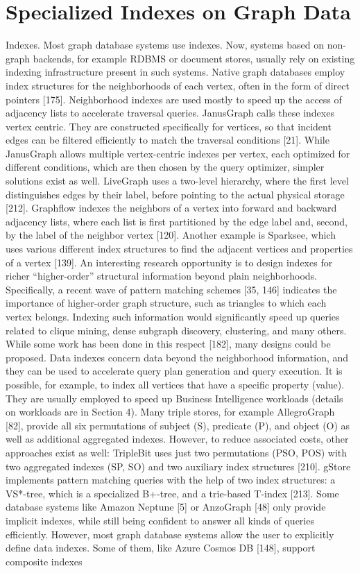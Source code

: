 \chapter{Specialized Indexes on Graph Data}
\label{chap:specialized_indexing}

Indexes. Most graph database systems use indexes. Now, systems based on non-graph backends, for example RDBMS or document stores, usually rely on existing indexing infrastructure present in such systems. Native graph databases employ index structures for the neighborhoods of each vertex, often in the form of direct pointers [175]. Neighborhood indexes are used mostly to speed up the access of adjacency lists to accelerate traversal queries. JanusGraph calls these indexes vertex centric. They are constructed specifically for vertices, so that incident edges can be filtered efficiently to match the traversal conditions [21]. While JanusGraph allows multiple vertex-centric indexes per vertex, each optimized for different conditions, which are then chosen by the query optimizer, simpler solutions exist as well. LiveGraph uses a two-level hierarchy, where the first level distinguishes edges by their label, before pointing to the actual physical storage [212]. Graphflow indexes the neighbors of a vertex into forward and backward adjacency lists, where each list is first partitioned by the edge label and, second, by the label of the neighbor vertex [120]. Another example is Sparksee, which uses various different index structures to find the adjacent vertices and properties of a vertex [139]. An interesting research opportunity is to design indexes for richer “higher-order” structural information beyond plain neighborhoods. Specifically, a recent wave of pattern matching schemes [35, 146] indicates the importance of higher-order graph structure, such as triangles to which each vertex belongs. Indexing such information would significantly speed up queries related to clique mining, dense subgraph discovery, clustering, and many others. While some work has been done in this respect [182], many designs could be proposed. Data indexes concern data beyond the neighborhood information, and they can be used to accelerate query plan generation and query execution. It is possible, for example, to index all vertices that have a specific property (value). They are usually employed to speed up Business Intelligence workloads (details on workloads are in Section 4). Many triple stores, for example AllegroGraph [82], provide all six permutations of subject (S), predicate (P), and object (O) as well as additional aggregated indexes. However, to reduce associated costs, other approaches exist as well: TripleBit uses just two permutations (PSO, POS) with two aggregated indexes (SP, SO) and two auxiliary index structures [210]. gStore implements pattern matching queries with the help of two index structures: a VS*-tree, which is a specialized B+-tree, and a trie-based T-index [213]. Some database systems like Amazon Neptune [5] or AnzoGraph [48] only provide implicit indexes, while still being confident to answer all kinds of queries efficiently. However, most graph database systems allow the user to explicitly define data indexes. Some of them, like Azure Cosmos DB [148], support composite indexes 